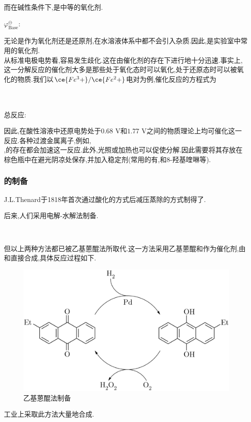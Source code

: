 \documentclass{ctexart}
\begin{document}
\indent 而在碱性条件下,是中等的氧化剂.
\begin{center}
    $\varphi^\ominus_{\text{Base}}$:\ \ \ 
\end{center}

\indent 无论是作为氧化剂还是还原剂,在水溶液体系中都不会引入杂质.因此,是实验室中常用的氧化剂.\\
\indent 从标准电极电势看,容易发生歧化.这在由催化剂的存在下进行地十分迅速.事实上,这一分解反应的催化剂大多是那些处于氧化态时可以氧化,处于还原态时可以被氧化的物质.我们以$\ce{Fe^3+}/\ce{Fe^2+}$电对为例,催化反应的方程式为
\begin{center}
    \\
    \\
    总反应:
\end{center}
因此,在酸性溶液中还原电势处于$0.68\text{ V}$和$1.77\text{ V}$之间的物质理论上均可催化这一反应.各种过渡金属离子,例如,\\,的存在都会加速这一反应.此外,光照或加热也可以促使分解.因此需要将其存放在棕色瓶中在避光阴凉处保存,并加入稳定剂(常用的有,和8-羟基喹啉等).
\subsubsection{的制备} J.L.Thenard于1818年首次通过酸化的方式后减压蒸除的方式制得了.
\begin{center}
\end{center}

\indent 后来,人们采用电解-水解法制备.
\begin{center}
    \\
\end{center}

\indent 但以上两种方法都已被乙基蒽醌法所取代.这一方法采用乙基蒽醌和作为催化剂,由和直接合成,具体反应过程如下.
\begin{figure}[H]
    \centering\includegraphics[scale=0.25]{picture/H2O2Prod.eps}
    \caption{乙基蒽醌法制备}
\end{figure}
工业上采取此方法大量地合成.
\end{document}
